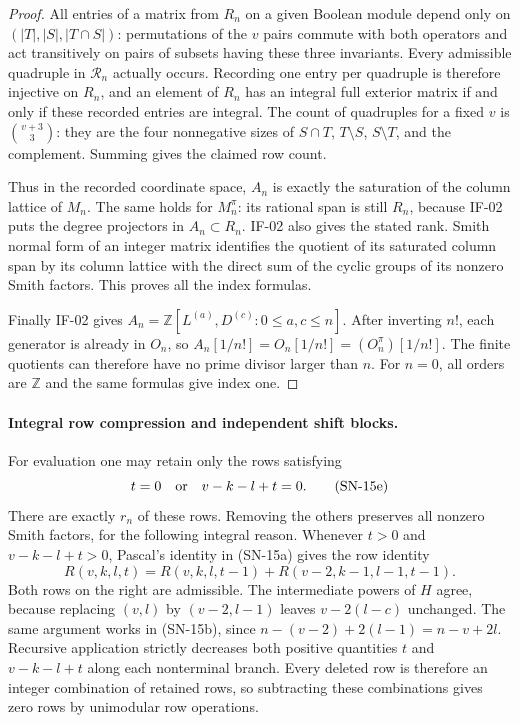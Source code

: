 \begin{proof}
All entries of a matrix from $R_n$ on a given Boolean module
depend only on $(|T|,|S|,|T\cap S|)$: permutations of the $v$
pairs commute with both operators and act transitively on pairs
of subsets having these three invariants. Every admissible
quadruple in $\mathcal R_n$ actually occurs. Recording one entry
per quadruple is therefore injective on $R_n$, and an element
of $R_n$ has an integral full exterior matrix if and only if
these recorded entries are integral. The count of quadruples
for a fixed $v$ is $\binom{v+3}{3}$: they are the four
nonnegative sizes of $S\cap T$, $T\setminus S$,
$S\setminus T$, and the complement. Summing gives the claimed
row count.

Thus in the recorded coordinate space, $A_n$ is exactly the
saturation of the column lattice of $M_n$. The same holds for
$M_n^\pi$: its rational span is still $R_n$, because IF-02
puts the degree projectors in $A_n\subset R_n$. IF-02 also
gives the stated rank. Smith normal form of an integer matrix
identifies the quotient of its saturated column span by its
column lattice with the direct sum of the cyclic groups of
its nonzero Smith factors. This proves all the index formulas.

Finally IF-02 gives
$A_n=\mathbb Z[L^{(a)},D^{(c)}:0\le a,c\le n]$.
After inverting $n!$, each generator is already in $O_n$,
so $A_n[1/n!]=O_n[1/n!]=(O_n^\pi)[1/n!]$.
The finite quotients can therefore have no prime divisor
larger than $n$. For $n=0$, all orders are $\mathbb Z$ and
the same formulas give index one.
\end{proof}

\paragraph{Integral row compression and independent shift blocks.}
For evaluation one may retain only the rows satisfying
\[
 t=0\quad\hbox{or}\quad v-k-l+t=0.                \tag{SN-15e}
\]
There are exactly $r_n$ of these rows. Removing the others preserves
all nonzero Smith factors, for the following integral reason.
Whenever $t>0$ and $v-k-l+t>0$, Pascal's identity in (SN-15a)
gives the row identity
\[
 R(v,k,l,t)=R(v,k,l,t-1)+R(v-2,k-1,l-1,t-1).      \tag{SN-15f}
\]
Both rows on the right are admissible. The intermediate powers of
$H$ agree, because replacing $(v,l)$ by $(v-2,l-1)$ leaves
$v-2(l-c)$ unchanged. The same argument works in (SN-15b), since
$n-(v-2)+2(l-1)=n-v+2l$. Recursive application strictly decreases
both positive quantities $t$ and $v-k-l+t$ along each nonterminal
branch. Every deleted row is therefore an integer combination of
retained rows, so subtracting these combinations gives zero rows
by unimodular row operations.

